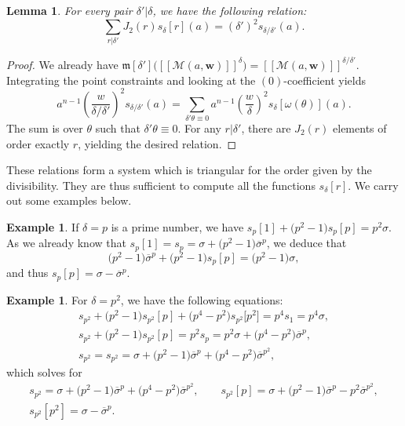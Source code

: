 \documentclass[11pt]{article}
\numberwithin{equation}{section}
\newcommand{\fvir}[2]{[\![ #1 ]\!]^{#2}}
\newcommand{\m}[1]{\mfk\left[ #1 \right]}
\newcommand{\bfw}{ {\boldsymbol w} }
\newcommand{\mfk}{\mathfrak{m}}
\newcommand{\M}{\mathcal{M}}
\numberwithin{equation}{section}
\newtheorem{lem}[theo]{Lemma}
\theoremstyle{definition}
\newtheorem{expl}[theo]{Example}
\begin{document}
\begin{lem}\label{lem-relation-sdelta}
For every pair $\delta'|\delta$, we have the following relation:
\[ \sum_{r|\delta'}J_2(r)s_\delta[r](a) = (\delta')^2s_{\delta/\delta'}(a). \]
\end{lem}

\begin{proof}
We already have $\m{\delta'}\bigl(\fvir{\M(a,\bfw)}{\delta}\bigr)=\fvir{\M(a,\bfw)}{\delta/\delta'}$. Integrating the point constraints and looking at the $(0)$-coefficient yields
\[ a^{n-1}\left(\frac{w}{\delta/\delta'}\right)^2 s_{\delta/\delta'}(a) = \sum_{\delta'\theta\equiv 0}a^{n-1}\left(\frac{w}{\delta}\right)^2s_\delta[\omega(\theta)](a). \]
The sum is over $\theta$ such that $\delta'\theta\equiv 0$. For any $r|\delta'$, there are $J_2(r)$ elements of order exactly $r$, yielding the desired relation.
\end{proof}

These relations form a system which is triangular for the order given by the divisibility. They are thus sufficient to compute all the functions $s_\delta[r]$. We carry out some examples below.

\begin{expl}
If $\delta=p$ is a prime number, we have
$s_p[1]+\bigl(p^2-1\bigr)s_p[p] =p^2\sigma$.
As we already know that $s_p[1]=s_p=\sigma+\bigl(p^2-1\bigr)\overline{\sigma}^p$, we deduce that
\[ \bigl(p^2-1\bigr)\overline{\sigma}^p+\bigl(p^2-1\bigr)s_p[p] = \bigl(p^2-1\bigr)\sigma, \]
and thus
$s_p[p]=\sigma-\overline{\sigma}^p$.
\end{expl}

\begin{expl}
For $\delta=p^2$, we have the following equations:
\begin{gather*}
 s_{p^2}+\bigl(p^2-1\bigr)s_{p^2}[p]+\bigl(p^4-p^2\bigr)s_{p^2}\big[p^2\big] = p^4s_1 =p^4\sigma, \\
 s_{p^2}+\bigl(p^2-1\bigr)s_{p^2}[p] = p^2s_p =p^2\sigma+\bigl(p^4-p^2\bigr)\overline{\sigma}^p, \\
 s_{p^2} = s_{p^2} = \sigma+\bigl(p^2-1\bigr)\overline{\sigma}^p+\bigl(p^4-p^2\bigr)\overline{\sigma}^{p^2},
 \end{gather*}
 which solves for
\begin{gather*}
 s_{p^2} = \sigma+\bigl(p^2-1\bigr)\overline{\sigma}^p+\bigl(p^4-p^2\bigr)\overline{\sigma}^{p^2}, \qquad
 s_{p^2}[p] = \sigma+\bigl(p^2-1\bigr)\overline{\sigma}^p -p^2\overline{\sigma}^{p^2}, \\
 s_{p^2}[p^2] = \sigma-\overline{\sigma}^p.
 \end{gather*}
\end{expl}
\end{document}
